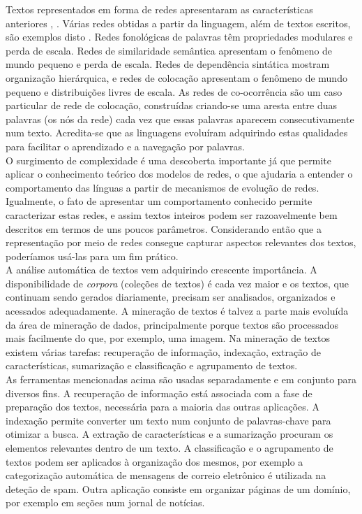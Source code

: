 \documentclass[a4paper,openright,12pt]{report} %
\begin{document}
Textos representados em forma de redes apresentaram as caracter\'isticas anteriores \cite{ferrer2001two}, \cite{dorogovtsev2001language}. V\'arias redes obtidas a partir da linguagem, al\'em de textos escritos, s\~ao exemplos disto \cite{choudhury2009structure}. Redes fonol\'ogicas de palavras t\^em propriedades modulares e perda de escala. Redes de similaridade sem\^antica apresentam o fen\^omeno de mundo pequeno e perda de escala. Redes de depend\^encia sint\'atica mostram organiza\c c\~ao hier\'arquica, e redes de coloca\c c\~ao apresentam o fen\^omeno de mundo pequeno e distribui\c c\~oes livres de escala. As redes de co-ocorr\^encia s\~ao um caso particular de rede de coloca\c c\~ao, constru\'idas criando-se uma aresta entre duas palavras (os n\'os da rede) cada vez que essas palavras aparecem consecutivamente num texto. Acredita-se que as linguagens evolu\'iram adquirindo estas qualidades para facilitar o aprendizado e a navega\c c\~ao por palavras.\\

O surgimento de complexidade \'e uma descoberta importante j\'a que permite aplicar o conhecimento te\'orico dos modelos de redes, o que ajudaria a entender o comportamento das l\'inguas a partir de mecanismos de evolu\c c\~ao de redes. 
Igualmente, o fato de apresentar um comportamento conhecido permite caracterizar estas redes, e assim textos inteiros podem ser razoavelmente bem descritos em termos de uns poucos par\^ametros. 
Considerando ent\~ao que a representa\c c\~ao por meio de redes consegue capturar aspectos relevantes dos textos, poder\'iamos us\'a-las para um fim pr\'atico.\\

A an\'alise autom\'atica de textos vem adquirindo crescente import\^ancia. A disponibilidade de \textit{corpora} (cole\c c\~oes de textos) \'e cada vez maior e os textos, que continuam sendo gerados diariamente, precisam ser analisados, organizados e acessados adequadamente. A minera\c c\~ao de textos \'e talvez a parte mais evolu\'ida da \'area de minera\c c\~ao de dados, principalmente porque textos s\~ao processados mais facilmente do que, por exemplo, uma imagem. Na minera\c c\~ao de textos existem v\'arias tarefas: recupera\c c\~ao de informa\c c\~ao, indexa\c c\~ao, extra\c c\~ao de caracter\'isticas, sumariza\c c\~ao e classifica\c c\~ao e agrupamento de textos.\\ 

As ferramentas mencionadas acima s\~ao usadas separadamente e em conjunto para diversos fins. 
A recupera\c c\~ao de informa\c c\~ao est\'a associada com a fase de prepara\c c\~ao dos textos, necess\'aria para a maioria das outras aplica\c c\~oes. 
A indexa\c c\~ao permite converter um texto num conjunto de palavras-chave para otimizar a busca. 
A extra\c c\~ao de caracter\'isticas e a sumariza\c c\~ao procuram os elementos relevantes dentro de um texto. 
A classifica\c c\~ao e o agrupamento de textos podem ser aplicados \`a organiza\c c\~ao dos mesmos, por exemplo a categoriza\c c\~ao autom\'atica de mensagens de correio eletr\^onico \'e utilizada na dete\c c\~ao de spam. Outra aplica\c c\~ao consiste em organizar p\'aginas de um dom\'inio, por exemplo em se\c c\~oes num jornal de not\'icias.\\
\end{document}
